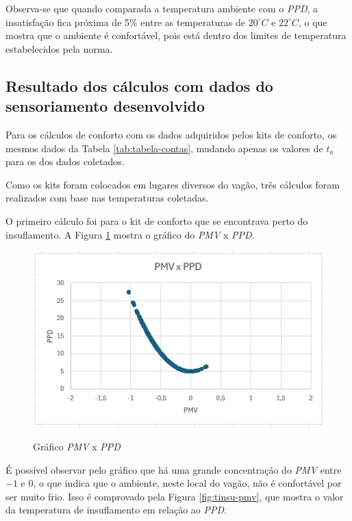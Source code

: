 \documentclass[acronym,symbols,table]{fei}
\begin{document}
Observa-se que quando comparada a temperatura ambiente com o \textit{PPD}, a insatisfação fica próxima de 5\% entre as temperaturas de $20^\circ C$ e $22^\circ C$, o que mostra que o ambiente é confortável, pois está dentro dos limites de temperatura estabelecidos pela norma.


\subsection{Resultado dos cálculos com dados do sensoriamento desenvolvido}

Para os cálculos de conforto com os dados adquiridos pelos kits de conforto, os mesmos dados da Tabela \ref{tab:tabela-contas}, mudando apenas os valores de $t_{a}$ para os dos dados coletados. 

Como os kits foram colocados em lugares diversos do vagão, três cálculos foram realizados com base nas temperaturas coletadas.

O primeiro cálculo foi para o kit de conforto que se encontrava perto do insuflamento. A Figura \ref{fig:pmv-ppd-insuflamento} mostra o gráfico do \textit{PMV} x \textit{PPD}.

\begin{figure}[!htb]
    \centering
    \caption{Gráfico \textit{PMV} x \textit{PPD}}
    \includegraphics[width=0.8\linewidth]{Imagens/pmv-ppd-insuflamento.jpeg}
    \label{fig:pmv-ppd-insuflamento}
\end{figure}

\newpage
É possível observar pelo gráfico que há uma grande concentração do \textit{PMV} entre $-1$ e $0$, o que indica que o ambiente, neste local do vagão, não é confortável por ser muito frio. Isso é comprovado pela Figura \ref{fig:tinsu-pmv}, que mostra o valor da temperatura de insuflamento em relação ao \textit{PPD}.
\end{document}
